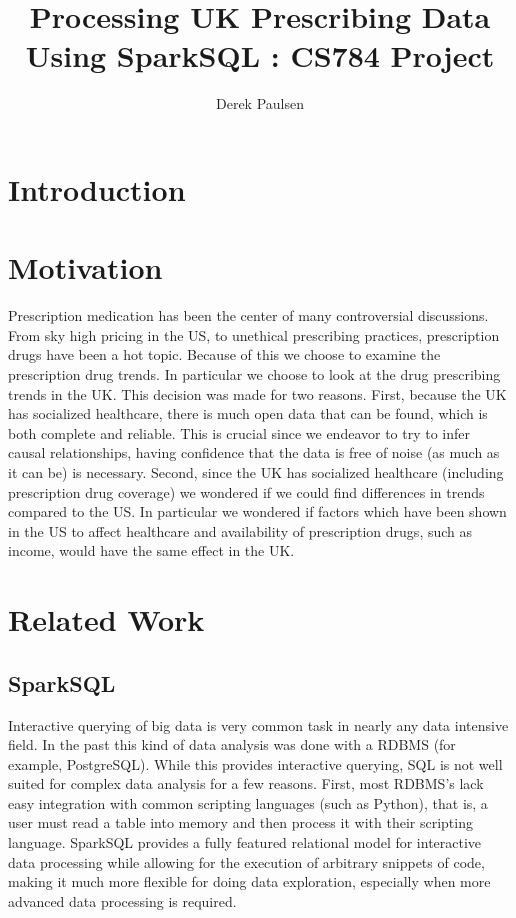 \documentclass[a4paper]{article}
\author{Derek Paulsen}
\title{Processing UK Prescribing Data Using SparkSQL : CS784 Project}
\begin{document}
\maketitle


\section{Introduction}

\section{Motivation}
	Prescription medication has been the center of many controversial discussions.
	From sky high pricing in the US, to unethical prescribing practices, prescription
	drugs have been a hot topic. Because of this we choose to examine the prescription drug 
	trends. In particular we choose to look at the drug prescribing trends in the UK. This
	decision was made for two reasons. First, because the UK has socialized healthcare, 
	there is much open data that can be found, which is both complete and reliable. This
	is crucial since we endeavor to try to infer causal relationships, having confidence 
	that the data is free of noise (as much as it can be) is necessary. Second, since the UK
	has socialized healthcare (including prescription drug coverage) we wondered if we could find
	differences in trends compared to the US. In particular we wondered if factors which
	have been shown in the US to affect healthcare and availability of prescription drugs, such
	as income, would have the same effect in the UK. 
	



	


\section{Related Work}

	\subsection{SparkSQL~\cite{ref:SparkSQL}}
		Interactive querying of big data is very common task in nearly any data intensive field. In the past
		this kind of data analysis was done with a RDBMS (for example, PostgreSQL). While this provides 
		interactive querying, SQL is not well suited for complex data analysis for a few reasons. First,
		most RDBMS's lack easy integration with common scripting languages (such as Python), that is,
		a user must read a table into memory and then process it with their scripting language.
		SparkSQL provides a fully featured relational model for interactive data processing while allowing for 
		the execution of arbitrary snippets of code, making it much more flexible for doing data exploration, especially 
		when more advanced data processing is required.
\end{document}
